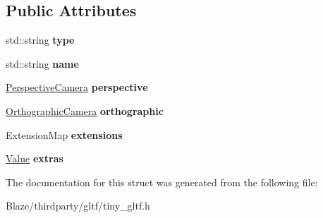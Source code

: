 \subsection*{Public Attributes}
\begin{DoxyCompactItemize}
\item 
\mbox{\label{structtinygltf_1_1Camera_a50badf33be08ecaf9faf77b90e7de4e9}} 
std\+::string {\bfseries type}
\item 
\mbox{\label{structtinygltf_1_1Camera_afbf100fab44e30eabf5d91c113325860}} 
std\+::string {\bfseries name}
\item 
\mbox{\label{structtinygltf_1_1Camera_a81d050265c6a41d7de8d375426368643}} 
\hyperlink{structtinygltf_1_1PerspectiveCamera}{Perspective\+Camera} {\bfseries perspective}
\item 
\mbox{\label{structtinygltf_1_1Camera_a46294ce175fc3e1cc66ffd1497bc4ff3}} 
\hyperlink{structtinygltf_1_1OrthographicCamera}{Orthographic\+Camera} {\bfseries orthographic}
\item 
\mbox{\label{structtinygltf_1_1Camera_a6e4e66edc7f61910a1b6f27b00ab4656}} 
Extension\+Map {\bfseries extensions}
\item 
\mbox{\label{structtinygltf_1_1Camera_ac715d0e6e4a25e2dd5ea916230d25b3b}} 
\hyperlink{classtinygltf_1_1Value}{Value} {\bfseries extras}
\end{DoxyCompactItemize}


The documentation for this struct was generated from the following file\+:\begin{DoxyCompactItemize}
\item 
Blaze/thirdparty/gltf/tiny\+\_\+gltf.\+h\end{DoxyCompactItemize}
